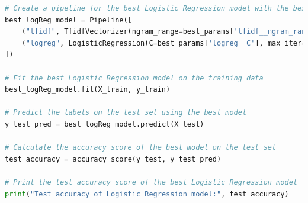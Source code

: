\documentclass{solutionclass} %
\begin{document}
\begin{lstlisting}[language=Python]
# Create a pipeline for the best Logistic Regression model with the best parameters
best_logReg_model = Pipeline([
    ("tfidf", TfidfVectorizer(ngram_range=best_params['tfidf__ngram_range'], max_features=best_params['tfidf__max_features'])),
    ("logreg", LogisticRegression(C=best_params['logreg__C'], max_iter=500, solver='newton-cg'))
])

# Fit the best Logistic Regression model on the training data
best_logReg_model.fit(X_train, y_train)

# Predict the labels on the test set using the best model
y_test_pred = best_logReg_model.predict(X_test)

# Calculate the accuracy score of the best model on the test set
test_accuracy = accuracy_score(y_test, y_test_pred)

# Print the test accuracy score of the best Logistic Regression model
print("Test accuracy of Logistic Regression model:", test_accuracy)
\end{lstlisting}
\end{document}
